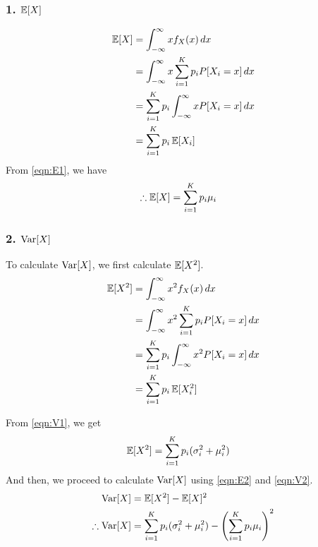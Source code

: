 \subsubsection*{1. $\operatorname{\mathbb{E}}[X]$}
\begin{align*}
	\operatorname{\mathbb{E}}[X] & = \int_{-\infty}^{\infty} x f_X(x) \, dx                    \\
	       & = \int_{-\infty}^{\infty} x \sum_{i=1}^K p_i P[X_i=x] \, dx \\
	       & = \sum_{i=1}^K p_i \int_{-\infty}^{\infty} x P[X_i=x] \, dx \\
	       & = \sum_{i=1}^K p_i \operatorname{\mathbb{E}}[X_i]
\end{align*}
From \cref{eqn:E1}, we have
\begin{align}
	\therefore \operatorname{\mathbb{E}}[X] & = \sum_{i=1}^K p_i \mu_i \label{eqn:E2}
\end{align}
\subsubsection*{2. $\operatorname{Var}[X]$}
To calculate $\operatorname{Var}[X]$, we first calculate $\operatorname{\mathbb{E}}[X^2]$.
\begin{align*}
	\operatorname{\mathbb{E}}[X^2] & = \int_{-\infty}^{\infty} x^2 f_X(x) \, dx                    \\
	         & = \int_{-\infty}^{\infty} x^2 \sum_{i=1}^K p_i P[X_i=x] \, dx \\
	         & = \sum_{i=1}^K p_i \int_{-\infty}^{\infty} x^2 P[X_i=x] \, dx \\
	         & = \sum_{i=1}^K p_i \operatorname{\mathbb{E}}[X_i^2]                                 \\
\end{align*}

From \cref{eqn:V1}, we get
\begin{align}
	\operatorname{\mathbb{E}}[X^2] & = \sum_{i=1}^K p_i (\sigma_i^2 + \mu_i^2) \label{eqn:V2}
\end{align}
And then, we proceed to calculate $\operatorname{Var}[X]$ using \cref{eqn:E2} and \cref{eqn:V2}.
\begin{align}
	\operatorname{Var}[X]            & = \operatorname{\mathbb{E}}[X^2] - \operatorname{\mathbb{E}}[X]^2                                                             \nonumber      \\
	\therefore \operatorname{Var}[X] & = \sum_{i=1}^K p_i (\sigma_i^2 + \mu_i^2) - \left(\sum_{i=1}^K p_i \mu_i\right)^2 \label{eqn:V3}
\end{align}

